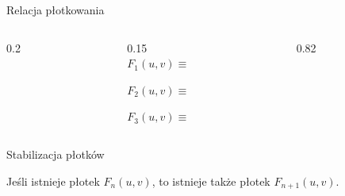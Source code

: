 
\begin{frame}{Relacja płotkowania}


\begin{columns}[c,onlytextwidth]
  \begin{column}{0.2\textwidth}
      
  \end{column}
  \begin{column}{0.15\textwidth} 
  \vspace{-3.5em}\\
    $F_1(u,v) \equiv$

    \vspace{4em}

    $F_2(u,v) \equiv$

    \vspace{5em}

    $F_3(u,v) \equiv$
  \end{column}

  \begin{column}{0.82\textwidth}
    

    

    
  \end{column}
\end{columns}

\end{frame}


\begin{frame}{Stabilizacja płotków}
    \begin{figure}
        \centering
    \end{figure}
    Jeśli istnieje płotek \(F_n(u,v)\), to istnieje także płotek \(F_{n+1}(u,v)\).
    \\
    \vspace{1em}
\end{frame}
